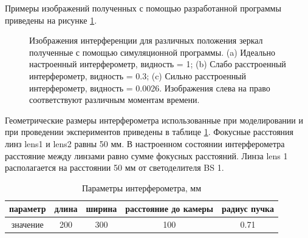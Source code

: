 Примеры изображений полученных с помощью разработанной программы приведены на рисунке \ref{fig:visib_expl}. 

\begin{figure}[ht]
    \caption{
    Изображения интерференции для различных положения зеркал полученные с помощью симуляционной программы. (a) Идеально настроенный интерферометр, видность = 1; (b) Слабо расстроенный интерферометр, видность = 0.3; (c) Сильно расстроенный интерферометр, видность = 0.0026. Изображения слева на право соответствуют различным моментам времени.}
\label{fig:visib_expl}
\end{figure}

Геометрические размеры интерферометра использованные при моделировании и при проведении экспериментов приведены в таблице \ref{tab:interf_stat_params}. Фокусные расстояния линз lens1 и lens2 равны 50 мм. В настроенном состоянии интерферометра расстояние между линзами равно сумме фокусных расстояний. Линза lens 1 располагается на расстоянии 50 мм от светоделителя BS 1.  

\begin{table} [htbp]
    \centering
    \begin{threeparttable}%
        \caption{Параметры интерферометра, мм}
        \begin{tabular}{|c|c|c|c|c|}
            \hline
            \hline
            параметр   & длина & ширина & расстояние до камеры & радиус пучка \\
            \hline
            значение & 200 & 300 & 100 & 0.71 \\
            \hline
            \hline
        \end{tabular}
        \label{tab:interf_stat_params}
    \end{threeparttable}
\end{table}

